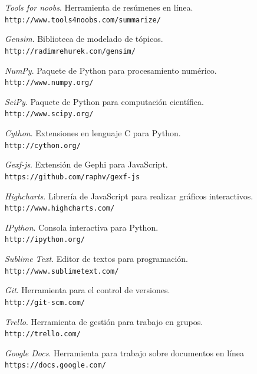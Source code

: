 \documentclass[12pt,a4paper]{article}
\begin{document}
\newpage
\begin{thebibliography}{1}

   \emph{Tools for noobs}. Herramienta de resúmenes en línea. \\
	\texttt{http://www.tools4noobs.com/summarize/}

   \emph{Gensim}. Biblioteca de modelado de tópicos. \\ 
	\texttt{http://radimrehurek.com/gensim/}

   \emph{NumPy}. Paquete de Python para procesamiento numérico. \\ 
	\texttt{http://www.numpy.org/}

   \emph{SciPy}. Paquete de Python para computación científica. \\ 
	\texttt{http://www.scipy.org/}

   \emph{Cython}. Extensiones en lenguaje C para Python. \\ 
	\texttt{http://cython.org/}

   \emph{Gexf-js}. Extensión de Gephi para JavaScript. \\ 
	\texttt{https://github.com/raphv/gexf-js}

   \emph{Highcharts}. Librería de JavaScript para realizar gráficos interactivos. \\
	\texttt{http://www.highcharts.com/}

   \emph{IPython}. Consola interactiva para Python. \\
	\texttt{http://ipython.org/}

   \emph{Sublime Text}. Editor de textos para programación. \\
	\texttt{http://www.sublimetext.com/}

   \emph{Git}. Herramienta para el control de versiones.\\
	\texttt{http://git-scm.com/}

   \emph{Trello}.  Herramienta de gestión para trabajo en grupos.\\
	\texttt{http://trello.com/}

   \emph{Google Docs}. Herramienta para trabajo sobre documentos en línea \\
	\texttt{https://docs.google.com/}

\end{thebibliography}
\end{document}
